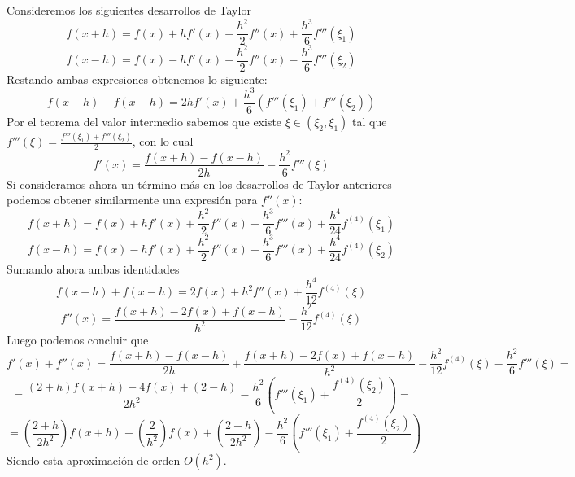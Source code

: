 \begin{sol}
Consideremos los siguientes desarrollos de Taylor
$$f(x+h)=f(x)+hf'(x)+\dfrac{h^2}{2}f''(x)+\dfrac{h^3}{6}f'''(\xi_1)$$
$$f(x-h)=f(x)-hf'(x)+\dfrac{h^2}{2}f''(x)-\dfrac{h^3}{6}f'''(\xi_2)$$
Restando ambas expresiones obtenemos lo siguiente:
$$f(x+h)-f(x-h)=2hf'(x)+\dfrac{h^3}{6}(f'''(\xi_1)+f'''(\xi_2))$$
Por el teorema del valor intermedio sabemos que existe $\xi\in(\xi_2,\xi_1)$ tal que \newline $f'''(\xi)=\frac{f'''(\xi_1)+f'''(\xi_2)}{2}$, con lo cual
$$f'(x)=\dfrac{f(x+h)-f(x-h)}{2h}-\dfrac{h^2}{6} f'''(\xi)$$
Si consideramos ahora un término más en los desarrollos de Taylor anteriores podemos obtener similarmente una expresión para $f''(x)$:
$$f(x+h)=f(x)+hf'(x)+\dfrac{h^2}{2}f''(x)+\dfrac{h^3}{6}f'''(x)+\dfrac{h^4}{24}f^{(4)}(\xi_1)$$
$$f(x-h)=f(x)-hf'(x)+\dfrac{h^2}{2}f''(x)-\dfrac{h^3}{6}f'''(x)+\dfrac{h^4}{24}f^{(4)}(\xi_2)$$
Sumando ahora ambas identidades
$$f(x+h)+f(x-h)=2f(x)+h^2f''(x)+\dfrac{h^4}{12}f^{(4)}(\xi)$$
$$f''(x)=\dfrac{f(x+h)-2f(x)+f(x-h)}{h^2}-\dfrac{h^2}{12}f^{(4)}(\xi)$$
Luego podemos concluir que
$$f'(x)+f''(x)=\dfrac{f(x+h)-f(x-h)}{2h}+\dfrac{f(x+h)-2f(x)+f(x-h)}{h^2}-\dfrac{h^2}{12}f^{(4)}(\xi)-\dfrac{h^2}{6} f'''(\xi)=$$
$$=\dfrac{(2+h)f(x+h)-4f(x)+(2-h)}{2h^2}-\dfrac{h^2}{6}\left(f'''(\xi_1)+\dfrac{f^{(4)}(\xi_2)}{2}\right)=$$
$$=\left(\dfrac{2+h}{2h^2}\right)f(x+h)-\left(\dfrac{2}{h^2}\right)f(x)+\left(\dfrac{2-h}{2h^2}\right)-\dfrac{h^2}{6}\left(f'''(\xi_1)+\dfrac{f^{(4)}(\xi_2)}{2}\right)$$
Siendo esta aproximación de orden $O(h^2)$.
\end{sol}